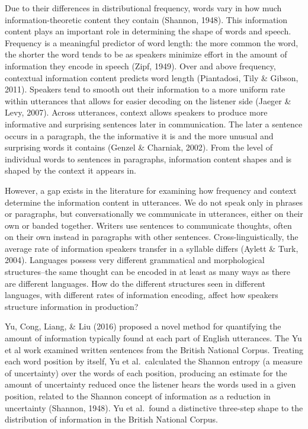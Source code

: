 \documentclass[11pt,]{article}
\begin{document}
Due to their differences in distributional frequency, words vary in how much information-theoretic content they contain (Shannon, 1948). This information content plays an important role in determining the shape of words and speech. Frequency is a meaningful predictor of word length: the more common the word, the shorter the word tends to be as speakers minimize effort in the amount of information they encode in speech (Zipf, 1949). Over and above frequency, contextual information content predicts word length (Piantadosi, Tily \& Gibson, 2011). Speakers tend to smooth out their information to a more uniform rate within utterances that allows for easier decoding on the listener side (Jaeger \& Levy, 2007). Across utterances, context allows speakers to produce more informative and surprising sentences later in communication. The later a sentence occurs in a paragraph, the the informative it is and the more unusual and surprising words it contains (Genzel \& Charniak, 2002). From the level of individual words to sentences in paragraphs, information content shapes and is shaped by the context it appears in.

However, a gap exists in the literature for examining how frequency and context determine the information content in utterances. We do not speak only in phrases or paragraphs, but conversationally we communicate in utterances, either on their own or banded together. Writers use sentences to communicate thoughts, often on their own instead in paragraphs with other sentences. Cross-linguistically, the average rate of information speakers transfer in a syllable differs (Aylett \& Turk, 2004). Languages possess very different grammatical and morphological structures--the same thought can be encoded in at least as many ways as there are different languages. How do the different structures seen in different languages, with different rates of information encoding, affect how speakers structure information in production?

Yu, Cong, Liang, \& Liu (2016) proposed a novel method for quantifying the amount of information typically found at each part of English utterances. The Yu et al work examined written sentences from the British National Corpus. Treating each word position by itself, Yu et al.~calculated the Shannon entropy (a measure of uncertainty) over the words of each position, producing an estimate for the amount of uncertainty reduced once the listener hears the words used in a given position, related to the Shannon concept of information as a reduction in uncertainty (Shannon, 1948). Yu et al.~found a distinctive three-step shape to the distribution of information in the British National Corpus.
\end{document}
